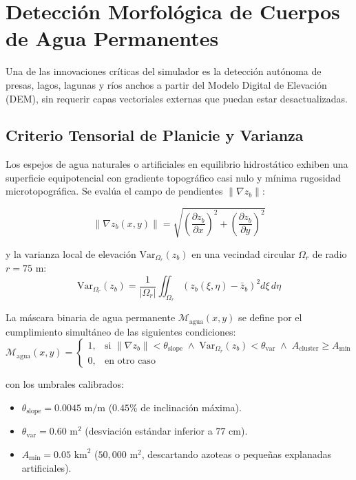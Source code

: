 \documentclass[11pt,a4paper]{article}
\begin{document}
\section{Detección Morfológica de Cuerpos de Agua Permanentes}

Una de las innovaciones críticas del simulador es la detección autónoma de presas, lagos, lagunas y ríos anchos a partir del Modelo Digital de Elevación (DEM), sin requerir capas vectoriales externas que puedan estar desactualizadas.

\subsection{Criterio Tensorial de Planicie y Varianza}

Los espejos de agua naturales o artificiales en equilibrio hidrostático exhiben una superficie equipotencial con gradiente topográfico casi nulo y mínima rugosidad microtopográfica. Se evalúa el campo de pendientes $\|\nabla z_b\|$:

\begin{equation}
  \|\nabla z_b(x,y)\| = \sqrt{\left(\frac{\partial z_b}{\partial x}\right)^2 + \left(\frac{\partial z_b}{\partial y}\right)^2}
\end{equation}

y la varianza local de elevación $\text{Var}_{\Omega_r}(z_b)$ en una vecindad circular $\Omega_r$ de radio $r = 75\text{ m}$:
\begin{equation}
  \text{Var}_{\Omega_r}(z_b) = \frac{1}{|\Omega_r|} \iint_{\Omega_r} \left( z_b(\xi,\eta) - \bar{z}_b \right)^2 d\xi\,d\eta
\end{equation}

La máscara binaria de agua permanente $\mathcal{M}_{\text{agua}}(x,y)$ se define por el cumplimiento simultáneo de las siguientes condiciones:
\begin{equation}
  \mathcal{M}_{\text{agua}}(x,y) =
  \begin{cases}
    1, & \text{si } \|\nabla z_b\| < \theta_{\text{slope}} \;\land\; \text{Var}_{\Omega_r}(z_b) < \theta_{\text{var}} \;\land\; A_{\text{cluster}} \ge A_{\min} \\
    0, & \text{en otro caso}
  \end{cases}
\end{equation}

con los umbrales calibrados:
\begin{itemize}
  \item $\theta_{\text{slope}} = 0.0045\text{ m/m}$ ($0.45\%$ de inclinación máxima).
  \item $\theta_{\text{var}} = 0.60\text{ m}^2$ (desviación estándar inferior a $77\text{ cm}$).
  \item $A_{\min} = 0.05\text{ km}^2$ ($50{,}000\text{ m}^2$, descartando azoteas o pequeñas explanadas artificiales).
\end{itemize}
\end{document}
